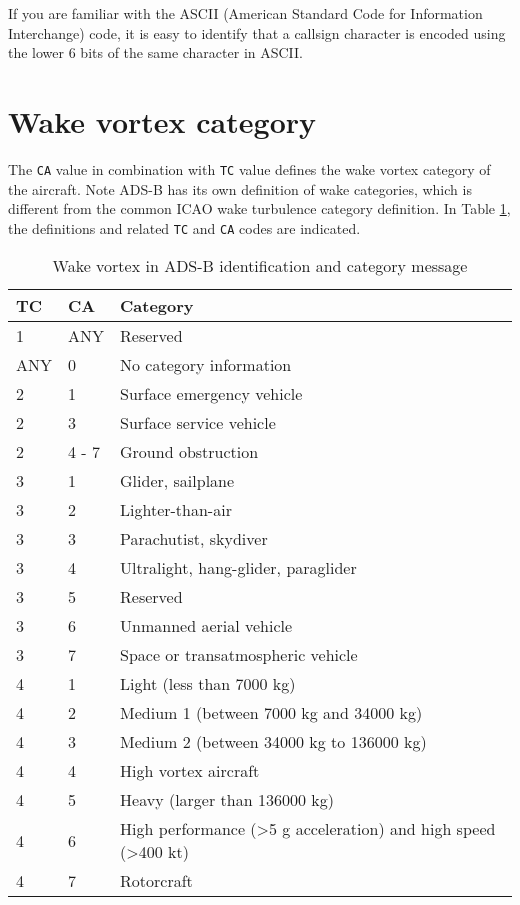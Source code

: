 If you are familiar with the ASCII (American Standard Code for Information Interchange) code, it is easy to identify that a callsign character is encoded using the lower 6 bits of the same character in ASCII.

\section{Wake vortex category}
The \texttt{CA} value in combination with \texttt{TC} value defines the wake vortex category of the aircraft. Note ADS-B has its own definition of wake categories, which is different from the common ICAO wake turbulence category definition. In Table \ref{tb:adsb_id_wake_category}, the definitions and related \texttt{TC} and \texttt{CA} codes are indicated.

\begin{table}[ht]
\caption{Wake vortex in ADS-B identification and category message}
\label{tb:adsb_id_wake_category}
\begin{tabular}{|l|l|l|}
\hline
\textbf{TC} & \textbf{CA} & \textbf{Category} \\ \hline\hline
1 & ANY & Reserved \\ \hline\hline
ANY & 0 & No category information \\ \hline\hline
2 & 1 & Surface emergency vehicle \\ \hline
2 & 3 & Surface service vehicle \\ \hline
2 & 4 - 7 & Ground obstruction \\ \hline\hline
3 & 1 & Glider, sailplane \\ \hline
3 & 2 & Lighter-than-air \\ \hline
3 & 3 & Parachutist, skydiver \\ \hline
3 & 4 & Ultralight, hang-glider, paraglider \\ \hline
3 & 5 & Reserved \\ \hline
3 & 6 & Unmanned aerial vehicle \\ \hline
3 & 7 & Space or transatmospheric vehicle \\ \hline\hline
4 & 1 & Light (less than 7000 kg) \\ \hline
4 & 2 & Medium 1 (between 7000 kg and 34000 kg) \\ \hline
4 & 3 & Medium 2 (between 34000 kg to 136000 kg) \\ \hline
4 & 4 & High vortex aircraft \\ \hline
4 & 5 & Heavy (larger than 136000 kg) \\ \hline
4 & 6 & High performance (\textgreater 5 g acceleration) and high speed (\textgreater 400 kt) \\ \hline
4 & 7 & Rotorcraft \\ \hline
\end{tabular}
\end{table}


